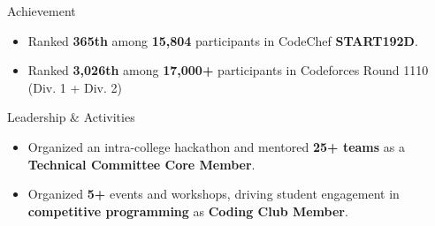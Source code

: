 \documentclass{resume}
\begin{document}

\begin{achievementSection}{Achievement}
  \begin{itemize}
      \itemsep -6pt {}
      \item Ranked \textbf{365th} among \textbf{15,804} participants in CodeChef \textbf{START192D}.
      \item Ranked \textbf{3,026th} among \textbf{17,000+} participants in Codeforces Round 1110 (Div. 1 + Div. 2)
  \end{itemize}
\end{achievementSection}

\begin{experienceSection}{Leadership \& Activities}
    \begin{itemize}
        \item Organized an intra-college hackathon and mentored \textbf{25+ teams} as a \textbf{Technical Committee Core Member}.
        \item Organized \textbf{5+} events and workshops, driving student engagement in \textbf{competitive programming} as \textbf{Coding Club Member}.

    \end{itemize}

\end{experienceSection}
\end{document}
